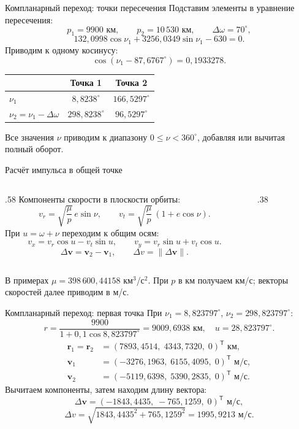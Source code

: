 \documentclass[11pt,aspectratio=169,t]{beamer}
\begin{document}
\begin{frame}{Компланарный переход: точки пересечения}
Подставим элементы в уравнение пересечения:
\[
p_1=9900\text{ км},\qquad p_2=10\,530\text{ км},\qquad
\Delta\omega=70^\circ,
\]
\[
132{,}0998\cos\nu_1+3256{,}0349\sin\nu_1-630=0.
\]
Приводим к одному косинусу:
\[
\cos(\nu_1-87{,}6767^\circ)=0{,}1933278.
\]
\centering
\renewcommand{\arraystretch}{1.05}
\begin{tabular}{@{}lcc@{}}
\toprule
 & Точка 1 & Точка 2\\\midrule
$\nu_1$ & $8{,}8238^\circ$ & $166{,}5297^\circ$\\
$\nu_2=\nu_1-\Delta\omega$ & $298{,}8238^\circ$ & $96{,}5297^\circ$\\\bottomrule
\end{tabular}\par\smallskip
\justifying
Все значения $\nu$ приводим к диапазону $0\le\nu<360^\circ$, добавляя или вычитая полный оборот.
\end{frame}

\begin{frame}{Расчёт импульса в общей точке}
\begin{columns}[T,onlytextwidth]
\begin{column}{.58\textwidth}
Компоненты скорости в плоскости орбиты:
\[
v_r=\sqrt{\frac\mu p}\,e\sin\nu,\qquad
v_t=\sqrt{\frac\mu p}\,(1+e\cos\nu).
\]
При $u=\omega+\nu$ переходим к общим осям:
\[
v_x=v_r\cos u-v_t\sin u,
\qquad
v_y=v_r\sin u+v_t\cos u.
\]
\[
\boxed{\Delta\mathbf v=\mathbf v_2-\mathbf v_1},\qquad \Delta v=\|\Delta\mathbf v\|.
\]
\end{column}
\begin{column}{.38\textwidth}
\centering
\end{column}
\end{columns}
\smallskip
\justifying
В примерах $\mu=398\,600{,}44158$ км$^3$/с$^2$.
При $p$ в км получаем км/с; векторы скоростей далее приводим в м/с.
\end{frame}

\begin{frame}{Компланарный переход: первая точка}
При $\nu_1=8{,}823797^\circ$, $\nu_2=298{,}823797^\circ$:
\[
r=\frac{9900}{1+0{,}1\cos8{,}823797^\circ}
=9009{,}6938\text{ км},\quad u=28{,}823797^\circ.
\]
\begin{align*}
\mathbf r_1=\mathbf r_2&=(7893{,}4514,\;4343{,}7320,\;0)^{\mathsf T}\text{ км},\\
\mathbf v_1&=(-3276{,}1963,\;6155{,}4095,\;0)^{\mathsf T}\text{ м/с},\\
\mathbf v_2&=(-5119{,}6398,\;5390{,}2835,\;0)^{\mathsf T}\text{ м/с}.
\end{align*}
Вычитаем компоненты, затем находим длину вектора:
\[
\Delta\mathbf v=(-1843{,}4435,\;-765{,}1259,\;0)^{\mathsf T}\text{ м/с},
\]
\[
\Delta v=\sqrt{1843{,}4435^2+765{,}1259^2}=1995{,}9213\text{ м/с}.
\]
\end{frame}
\end{document}

